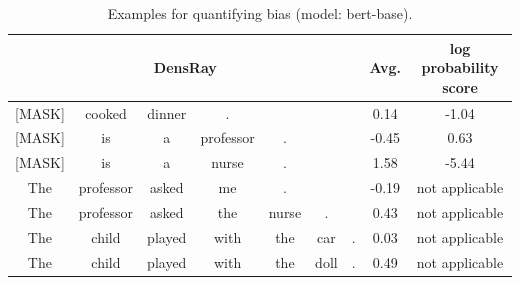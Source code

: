 \begin{table}[h]
	\centering
	\footnotesize
	\vspace{0cm}  
	\setlength{\abovecaptionskip}{0.2cm}   
	\setlength{\belowcaptionskip}{0cm}
	\begin{tabular}{ccccccc|c||c}
		\hline
		\multicolumn{7}{c|}{DensRay}&Avg.&log probability score\\		
		\hline\hline
		{\color{red} [MASK]} &{\color{red} cooked} &{\color{red} dinner} &{\color{blue}.}&&&&{\color{red} 0.14}& {\color{red} -1.04}\\
		\hline
		{\color{blue} [MASK]} &{\color{blue} is} &{\color{blue} a} &{\color{blue} professor}& {\color{red} .} &&&{\color{blue}-0.45}& {\color{blue}0.63}\\
		\hline
		{\color{red}[MASK]} &{\color{red}is} &{\color{red}a} &{\color{red}nurse}& {\color{red}.} &&& {\color{red}1.58} &{\color{red}-5.44}\\
		\hline
		{\color{blue}The} &{\color{blue}professor} &{\color{blue}asked} &{\color{red}me}& {\color{red}.} &&&{\color{blue}-0.19} & not applicable\\
		\hline
		{\color{blue}The} &{\color{blue}professor} &{\color{red}asked} &{\color{red}the}&{\color{red}nurse} &{\color{red}.}&&{\color{red}0.43}& not applicable\\
		\hline
		{\color{blue}The}&{\color{red}child} &{\color{blue}played} &{\color{red}with}&{\color{red}the}&{\color{red}car}&{\color{blue}.}&{\color{red}0.03}&not applicable\\
		\hline
		{\color{blue}The}&{\color{red}child} &{\color{red}played} &{\color{red}with}&{\color{red}the}&{\color{red}doll}&{\color{blue}.}&{\color{red}0.49}&not applicable\\
		\hline
	\end{tabular}
	\caption{
		Examples for quantifying bias (model: bert-base).}
\end{table}




